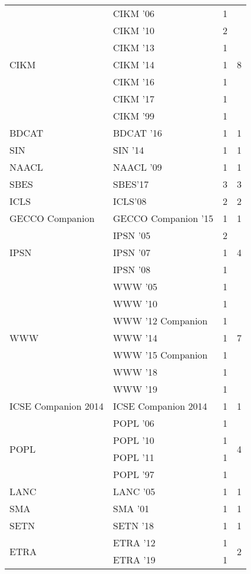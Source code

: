 \begin{table*}[t]
\begin{tabular}{llrr}
\multirow{7}{*}{CIKM } & CIKM '06 & 1 & \multirow{7}{*}{8}\\
& CIKM '10 & 2 &\\
& CIKM '13 & 1 &\\
& CIKM '14 & 1 &\\
& CIKM '16 & 1 &\\
& CIKM '17 & 1 &\\
& CIKM '99 & 1 &\\
\multirow{1}{*}{BDCAT } & BDCAT '16 & 1 & \multirow{1}{*}{1}\\
\multirow{1}{*}{SIN } & SIN '14 & 1 & \multirow{1}{*}{1}\\
\multirow{1}{*}{NAACL } & NAACL '09 & 1 & \multirow{1}{*}{1}\\
\multirow{1}{*}{SBES} & SBES'17 & 3 & \multirow{1}{*}{3}\\
\multirow{1}{*}{ICLS} & ICLS'08 & 2 & \multirow{1}{*}{2}\\
\multirow{1}{*}{GECCO Companion } & GECCO Companion '15 & 1 & \multirow{1}{*}{1}\\
\multirow{3}{*}{IPSN } & IPSN '05 & 2 & \multirow{3}{*}{4}\\
& IPSN '07 & 1 &\\
& IPSN '08 & 1 &\\
\multirow{7}{*}{WWW } & WWW '05 & 1 & \multirow{7}{*}{7}\\
& WWW '10 & 1 &\\
& WWW '12 Companion & 1 &\\
& WWW '14 & 1 &\\
& WWW '15 Companion & 1 &\\
& WWW '18 & 1 &\\
& WWW '19 & 1 &\\
\multirow{1}{*}{ICSE Companion 2014} & ICSE Companion 2014 & 1 & \multirow{1}{*}{1}\\
\multirow{4}{*}{POPL } & POPL '06 & 1 & \multirow{4}{*}{4}\\
& POPL '10 & 1 &\\
& POPL '11 & 1 &\\
& POPL '97 & 1 &\\
\multirow{1}{*}{LANC } & LANC '05 & 1 & \multirow{1}{*}{1}\\
\multirow{1}{*}{SMA } & SMA '01 & 1 & \multirow{1}{*}{1}\\
\multirow{1}{*}{SETN } & SETN '18 & 1 & \multirow{1}{*}{1}\\
\multirow{2}{*}{ETRA } & ETRA '12 & 1 & \multirow{2}{*}{2}\\
& ETRA '19 & 1 &\\

\end{tabular}
\end{table*}
